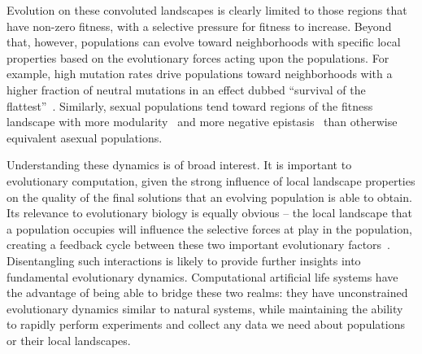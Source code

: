\documentclass[PhD]{msu-thesis}
\begin{document}
Evolution on these convoluted landscapes is clearly limited to those regions that have non-zero fitness, with a selective pressure for fitness to increase. Beyond that, however, populations can evolve toward neighborhoods with specific local properties based on the evolutionary forces acting upon the populations. For example, high mutation rates drive populations toward neighborhoods with a higher fraction of neutral mutations in an effect dubbed “survival of the flattest”~\cite{wilke_evolution_2001}. Similarly, sexual populations tend toward regions of the fitness landscape with more modularity~\cite{misevic_sexual_2006} and more negative epistasis~\cite{misevic_experiments_2010} than otherwise equivalent asexual populations.

Understanding these dynamics is of broad interest. It is important to evolutionary computation, given the strong influence of local landscape properties on the quality of the final solutions that an evolving population is able to obtain. Its relevance to evolutionary biology is equally obvious -- the local landscape that a population occupies will influence the selective forces at play in the population, creating a feedback cycle between these two important evolutionary factors~\cite{zaman_coevolution_2014,meyer_repeatability_2012,martin_fitness_2006,kvitek_reciprocal_2011}. Disentangling such interactions is likely to provide further insights into fundamental evolutionary dynamics. Computational artificial life systems have the advantage of being able to bridge these two realms: they have unconstrained evolutionary dynamics similar to natural systems, while maintaining the ability to rapidly perform experiments and collect any data we need about populations or their local landscapes.
%
%
%
%
%
%
\end{document}
